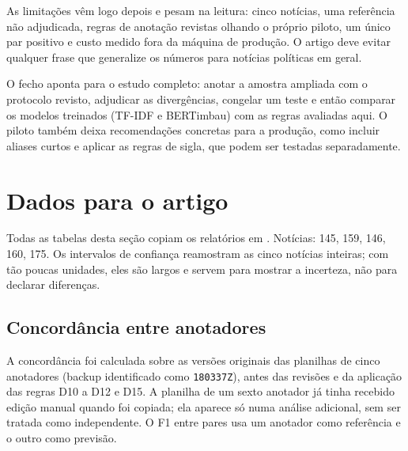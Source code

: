 \documentclass[11pt,a4paper]{article}
\begin{document}
As limitações vêm logo depois e pesam na leitura: cinco notícias, uma referência não adjudicada, regras de anotação revistas olhando o próprio piloto, um único par positivo e custo medido fora da máquina de produção. O artigo deve evitar qualquer frase que generalize os números para notícias políticas em geral.

O fecho aponta para o estudo completo: anotar a amostra ampliada com o protocolo revisto, adjudicar as divergências, congelar um teste e então comparar os modelos treinados (TF-IDF e BERTimbau) com as regras avaliadas aqui. O piloto também deixa recomendações concretas para a produção, como incluir aliases curtos e aplicar as regras de sigla, que podem ser testadas separadamente.

\section{Dados para o artigo}\label{sec:dados}

Todas as tabelas desta seção copiam os relatórios em . Notícias: 145, 159, 146, 160, 175. Os intervalos de confiança reamostram as cinco notícias inteiras; com tão poucas unidades, eles são largos e servem para mostrar a incerteza, não para declarar diferenças.

\subsection{Concordância entre anotadores}

A concordância foi calculada sobre as versões originais das planilhas de cinco anotadores (backup identificado como \texttt{180337Z}), antes das revisões e da aplicação das regras D10 a D12 e D15. A planilha de um sexto anotador já tinha recebido edição manual quando foi copiada; ela aparece só numa análise adicional, sem ser tratada como independente. O F1 entre pares usa um anotador como referência e o outro como previsão.
\end{document}
